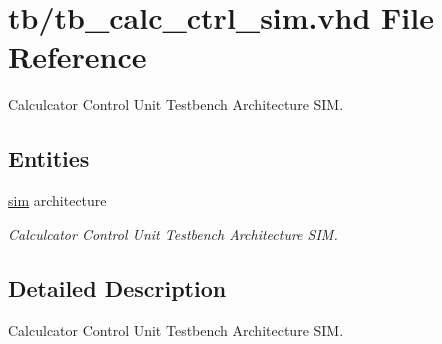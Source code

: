 \hypertarget{tb__calc__ctrl__sim_8vhd}{}\section{tb/tb\+\_\+calc\+\_\+ctrl\+\_\+sim.vhd File Reference}
\label{tb__calc__ctrl__sim_8vhd}


Calculcator Control Unit Testbench Architecture S\+IM.  


\subsection*{Entities}
\begin{DoxyCompactItemize}
\item 
\hyperlink{classtb__calc__ctrl_1_1sim}{sim} architecture
\begin{DoxyCompactList}\small\item\em Calculcator Control Unit Testbench Architecture S\+IM. \end{DoxyCompactList}\end{DoxyCompactItemize}


\subsection{Detailed Description}
Calculcator Control Unit Testbench Architecture S\+IM. 

